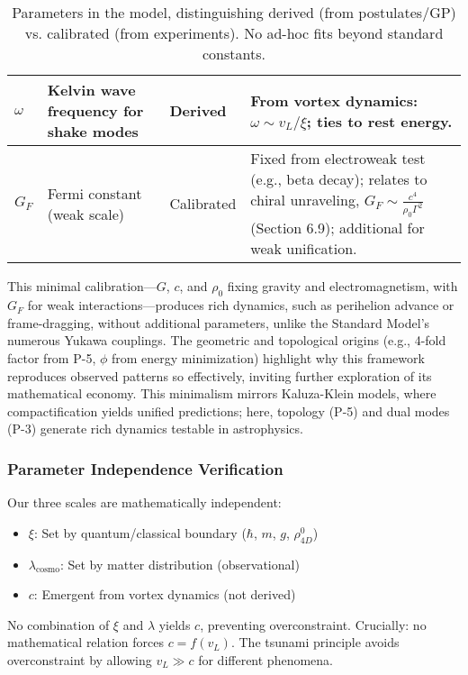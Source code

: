 \begin{table}[H]
\begin{tabularx}{\linewidth}{|p{1.5cm}|p{2cm}|l|Y|}
\hline
$\omega$ & Kelvin wave frequency for shake modes & Derived & From vortex dynamics: $\omega \sim v_L / \xi$; ties to rest energy. \\
\hline
$G_F$ & Fermi constant (weak scale) & Calibrated & Fixed from electroweak test (e.g., beta decay); relates to chiral unraveling, $G_F \sim \frac{c^4}{\rho_0 \Gamma^2}$ (Section 6.9); additional for weak unification. \\
\hline
\end{tabularx}
\caption{Parameters in the model, distinguishing derived (from postulates/GP) vs. calibrated (from experiments). No ad-hoc fits beyond standard constants.}
\label{tab:parameters}
\end{table}

This minimal calibration---$G$, $c$, and $\rho_0$ fixing gravity and electromagnetism, with $G_F$ for weak interactions---produces rich dynamics, such as perihelion advance or frame-dragging, without additional parameters, unlike the Standard Model's numerous Yukawa couplings. The geometric and topological origins (e.g., 4-fold factor from P-5, $\phi$ from energy minimization) highlight why this framework reproduces observed patterns so effectively, inviting further exploration of its mathematical economy. This minimalism mirrors Kaluza-Klein models, where compactification yields unified predictions; here, topology (P-5) and dual modes (P-3) generate rich dynamics testable in astrophysics.

\subsubsection{Parameter Independence Verification}

Our three scales are mathematically independent:
\begin{itemize}
\item $\xi$: Set by quantum/classical boundary ($\hbar$, $m$, $g$, $\rho_{4D}^0$)
\item $\lambda_{\text{cosmo}}$: Set by matter distribution (observational)
\item $c$: Emergent from vortex dynamics (not derived)
\end{itemize}

No combination of $\xi$ and $\lambda$ yields $c$, preventing overconstraint. Crucially: no mathematical relation forces $c = f(v_L)$. The tsunami principle avoids overconstraint by allowing $v_L \gg c$ for different phenomena.

